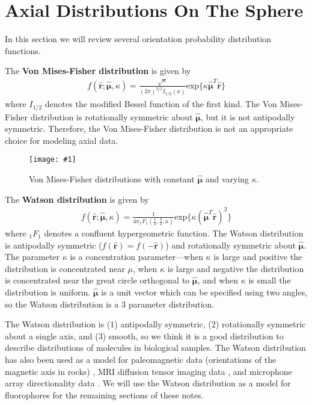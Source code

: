\documentclass[11pt]{article}
\providecommand{\mh}[1]{\mathbf{\hat{#1}}}
\providecommand{\bs}[1]{\boldsymbol{#1}}
\providecommand{\fig}[4]{
\begin{figure}[h]
 \captionsetup{width=1.0\linewidth}
 \centering
 \texttt{[image: \#1]}
 \caption{#3}
 \label{fig:#4}
\end{figure}
}
\begin{document}
\section{Axial Distributions On The Sphere}
In this section we will review several orientation probability distribution functions. 

The \textbf{Von Mises-Fisher distribution} is given by
\begin{align*}
  f(\mh{r}; \bs{\hat{\mu}}, \kappa) = \frac{\sqrt{\kappa}}{(2\pi{})^{3/2}I_{1/2}(\kappa)}\text{exp}\{\kappa \bs{\hat{\mu}}^T\mh{r}\}
\end{align*}
where $I_{1/2}$ denotes the modified Bessel function of the first kind. The Von
Mises-Fisher distribution is rotationally symmetric about $\bs{\hat{\mu}}$, but
it is not antipodally symmetric. Therefore, the Von Mises-Fisher distribution is
not an appropriate choice for modeling axial data.

\fig{../figures/vonmises.pdf}{1.0}{Von Mises-Fisher distributions with constant $\bs{\hat{\mu}}$ and varying $\kappa$. }{vonmises}

The \textbf{Watson distribution} \cite{sra2007modeling, jupp} is given by
\begin{align*}
  f(\mh{r}; \bs{\hat{\mu}}, \kappa) = \frac{1}{4\pi{}_1F_1\left(\frac{1}{2}, \frac{3}{2}, \kappa\right)}\text{exp}\{\kappa (\bs{\hat{\mu}}^T\mh{r})^2\}
\end{align*}
where ${}_1F_1$ denotes a confluent hypergeometric function. The Watson
distribution is antipodally symmetric ($f(\mh{r}) = f(-\mh{r})$) and
rotationally symmetric about $\bs{\hat{\mu}}$. The parameter $\kappa$ is a
concentration parameter---when $\kappa$ is large and positive the distribution
is concentrated near $\mu$, when $\kappa$ is large and negative the distribution
is concentrated near the great circle orthogonal to $\bs{\hat{\mu}}$, and when
$\kappa$ is small the distribution is uniform. $\bs{\hat{\mu}}$ is a unit vector
which can be specified using two angles, so the Watson distribution is a 3
parameter distribution.

The Watson distribution is (1) antipodally symmetric, (2) rotationally symmetric
about a single axis, and (3) smooth, so we think it is a good distribution to
describe distributions of molecules in biological samples. The Watson
distribution has also been used as a model for paleomagnetic data (orientations
of the magnetic axis in rocks) \cite{Love2007}, MRI diffusion tensor imaging
data \cite{Jespersen2012}, and microphone array directionality data
\cite{alex}. We will use the Watson distribution as a model for fluorophores for
the remaining sections of these notes.
\end{document}
